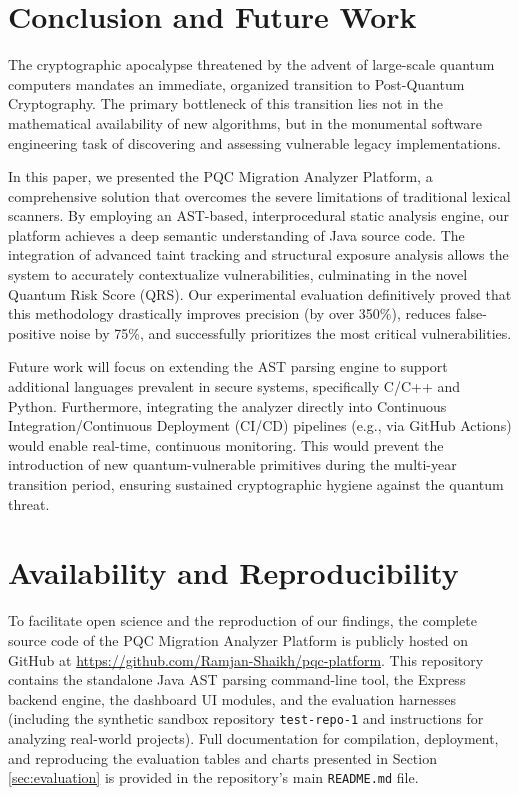 \documentclass[conference]{IEEEtran}
\begin{document}
\section{Conclusion and Future Work}
The cryptographic apocalypse threatened by the advent of large-scale quantum computers mandates an immediate, organized transition to Post-Quantum Cryptography. The primary bottleneck of this transition lies not in the mathematical availability of new algorithms, but in the monumental software engineering task of discovering and assessing vulnerable legacy implementations. 

In this paper, we presented the PQC Migration Analyzer Platform, a comprehensive solution that overcomes the severe limitations of traditional lexical scanners. By employing an AST-based, interprocedural static analysis engine, our platform achieves a deep semantic understanding of Java source code. The integration of advanced taint tracking and structural exposure analysis allows the system to accurately contextualize vulnerabilities, culminating in the novel Quantum Risk Score (QRS). Our experimental evaluation definitively proved that this methodology drastically improves precision (by over 350\%), reduces false-positive noise by 75\%, and successfully prioritizes the most critical vulnerabilities.

Future work will focus on extending the AST parsing engine to support additional languages prevalent in secure systems, specifically C/C++ and Python. Furthermore, integrating the analyzer directly into Continuous Integration/Continuous Deployment (CI/CD) pipelines (e.g., via GitHub Actions) would enable real-time, continuous monitoring. This would prevent the introduction of new quantum-vulnerable primitives during the multi-year transition period, ensuring sustained cryptographic hygiene against the quantum threat.

\section*{Availability and Reproducibility}
To facilitate open science and the reproduction of our findings, the complete source code of the PQC Migration Analyzer Platform is publicly hosted on GitHub at \url{https://github.com/Ramjan-Shaikh/pqc-platform}. This repository contains the standalone Java AST parsing command-line tool, the Express backend engine, the dashboard UI modules, and the evaluation harnesses (including the synthetic sandbox repository \texttt{test-repo-1} and instructions for analyzing real-world projects). Full documentation for compilation, deployment, and reproducing the evaluation tables and charts presented in Section \ref{sec:evaluation} is provided in the repository's main \texttt{README.md} file.
\end{document}
